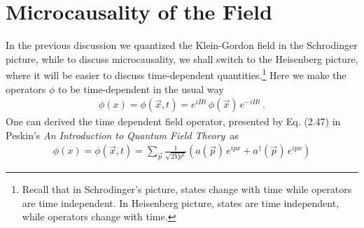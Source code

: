 \documentclass[11pt, onesided]{book}
\theoremstyle{break}
\theoremstyle{break}
\newcommand{\txt}{Peskin's \textit{An Introduction to Quantum Field Theory}}
\begin{document}
\section[Microcausality of the Field]{\color{red}Microcausality of the Field\color{black}}
In the previous discussion we quantized the Klein-Gordon field in the Schrodinger picture, while to discuss microcausality, we shall switch to the Heisenberg picture, where it will be easier to discuss time-dependent quantities.\footnote{Recall that in Schrodinger's picture, states change with time while operators are time independent. In Heisenberg picture, states are time independent, while operators change with time.} Here we make the operators $\phi$ to be time-dependent in the usual way
\begin{align*}
\phi(x) = \phi(\vec{x},t) = e^{iHt}\, \phi(\vec{x})\, e^{-iHt}\,.
\end{align*}
One can derived the time dependent field operator, presented by Eq. (2.47) in \txt\, as 
\begin{align*}
\phi(x) = \phi(\vec{x},t) = \sum_{\vec{p}} \frac{1}{\sqrt{2Vp^0}}\left( a(\vec{p})\,e^{ipx} + a^\dagger(\vec{p})\, e^{ipx}\right)
\end{align*}
\end{document}
